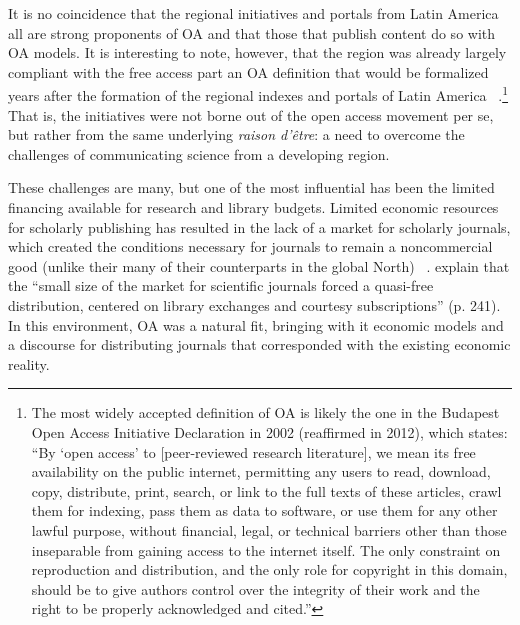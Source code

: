 It is no coincidence that the regional initiatives and portals from Latin America all are strong proponents of OA and that those that publish content do so with OA models. It is interesting to note, however, that the region was already largely compliant with the free access part an OA definition that would be formalized years after the formation of the regional indexes and portals of Latin America ~\citep{Alperin2011a,Alperin2008,Melero2010,Figari2008,Estrada-Mejia2010}.\footnote{The most widely accepted definition of OA is likely the one in the Budapest Open Access Initiative Declaration in 2002 (reaffirmed in 2012), which states: ``By `open access' to [peer-reviewed research literature], we mean its free availability on the public internet, permitting any users to read, download, copy, distribute, print, search, or link to the full texts of these articles, crawl them for indexing, pass them as data to software, or use them for any other lawful purpose, without financial, legal, or technical barriers other than those inseparable from gaining access to the internet itself. The only constraint on reproduction and distribution, and the only role for copyright in this domain, should be to give authors control over the integrity of their work and the right to be properly acknowledged and cited.''} That is, the initiatives were not borne out of the open access movement per se, but rather from the same underlying \emph{raison d'être}: a need to overcome the challenges of communicating science from a developing region.

These challenges are many, but one of the most influential has been the limited financing available for research and library budgets. Limited economic resources for scholarly publishing has resulted in the lack of a market for scholarly journals, which created the conditions necessary for journals to remain a noncommercial good (unlike their many of their counterparts in the global North) ~\citep{Estrada-Mejia2010,Holdom2005,Packer2007}.  \citet{Estrada-Mejia2010} explain that the ``small size of the market for scientific journals forced a quasi-free distribution, centered on library exchanges and courtesy subscriptions'' (p. 241). In this environment, OA was a natural fit, bringing with it economic models and a discourse for distributing journals that corresponded with the existing economic reality.

